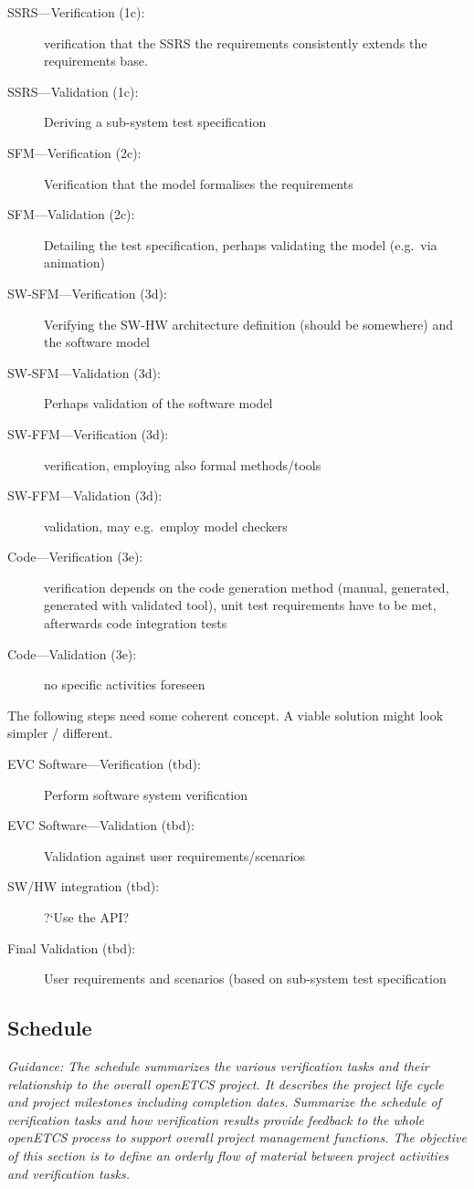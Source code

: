 \documentclass{template/openetcs_report}
\newcommand{\qq}[1]{?`#1?}
\begin{document}
\begin{description}
\item[SSRS---Verification (1c):] verification that the SSRS the requirements
  consistently extends the requirements base. 
\item[SSRS---Validation (1c):] Deriving a sub-system test specification
\item[SFM---Verification (2c):] Verification that the model formalises
  the requirements
\item[SFM---Validation (2c):] Detailing the test specification,
  perhaps validating the model (e.g.\ via animation)
\item[SW-SFM---Verification (3d):] Verifying the SW-HW architecture
  definition (should be somewhere) and the software model
\item[SW-SFM---Validation (3d):]Perhaps validation of the software model
\item[SW-FFM---Verification (3d):]  verification, employing also
  formal methods/tools 
\item[SW-FFM---Validation (3d):] validation, may e.g.\ employ model checkers
\item[Code---Verification (3e):] verification depends on the code
  generation method (manual, generated, generated with validated
  tool), unit test requirements have to be met, afterwards code
  integration tests
\item[Code---Validation (3e):] no specific activities foreseen
\end{description}

The following steps need some coherent concept. A viable solution
might look simpler / different.  
\begin{description}
\item[EVC Software---Verification (tbd):] Perform software system verification
\item[EVC Software---Validation (tbd):] Validation against user
  requirements/scenarios 
\item[SW/HW integration (tbd):] \qq{Use the API}
\item[Final Validation (tbd):] User requirements and scenarios (based
  on sub-system test specification
\end{description}

\subsection{Schedule}
\textit{Guidance: The schedule summarizes the various verification tasks
and their relationship to the overall openETCS project.
It describes the project life cycle and project milestones including completion dates.
Summarize the schedule of verification tasks and how verification results provide feedback to the whole openETCS process to support overall project management functions.
The objective of this section is to define an orderly flow of material between project activities and verification tasks.}
\end{document}
